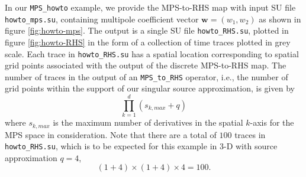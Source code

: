 In our {\tt MPS\_howto} example, we provide the MPS-to-RHS map with 
input SU file {\tt howto\_mps.su}, containing multipole coefficient vector $\mathbf w=(w_1,w_2)$ as shown in figure \ref{fig:howto-mps}.
The output is a single SU file {\tt howto\_RHS.su}, plotted in figure \ref{fig:howto-RHS} 
in the form of a collection of time traces plotted in grey scale.
Each trace in {\tt howto\_RHS.su} has a spatial location corresponding to spatial grid points associated
with the output of the discrete MPS-to-RHS map. 
The number of traces in the output of an {\tt MPS\_to\_RHS} operator, 
i.e., the number of grid points within the support of our singular source approximation,
is given by
\[
	\prod_{k=1}^d (s_{k,max} +q)
\]
where $s_{k,max}$ is the maximum number of derivatives in the spatial $k$-axis for the MPS space in consideration.
Note that there are a total of $100$ traces in {\tt howto\_RHS.su}, which is 
to be expected for this example in 3-D with source approximation $q=4$,
\[
	(1+4)\times(1+4)\times 4 = 100.
\]




